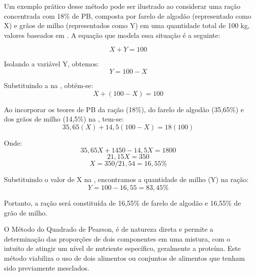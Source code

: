 Um exemplo prático desse método pode ser ilustrado ao considerar uma ração concentrada com 18\% de \gls{PB}, composta por farelo de algodão (representado como X) e grãos de milho (representados como Y) em uma quantidade total de 100 kg, valores baseados em . A equação que modela essa situação é a seguinte:

\begin{equation}
  \label{eq:algebrico1}
  X + Y = 100
\end{equation}

Isolando a variável Y, obtemos:
\begin{equation}
  \label{eq:algebrico2}
  Y = 100 - X
\end{equation}

Substituindo a  na , obtém-se:
\begin{equation}
  \label{eq:algebrico3}
  X + (100 - X) = 100
\end{equation}

Ao incorporar os teores de \gls{PB} da ração (18\%), do farelo de algodão (35,65\%) e dos grãos de milho (14,5\%) na , tem-se:
\begin{equation}
  \label{eq:algebrico4}
  35,65 (X) + 14,5 (100 - X) = 18 (100)
\end{equation}

Onde:
\begin{equation}
  \label{eq:algebrico5}
  35,65X + 1450 - 14,5X = 1800
\end{equation}
\begin{equation}
  \label{eq:algebrico6}
  21,15X = 350
\end{equation}
\begin{equation}
  \label{eq:algebrico7}
  X = 350 / 21,54 = 16,55\%
\end{equation}

Substituindo o valor de X na , encontramos a quantidade de milho (Y) na ração:
\begin{equation}
  \label{eq:algebrico8}
  Y = 100 - 16,55 = 83,45\%
\end{equation}

Portanto, a ração será constituída de 16,55\% de farelo de algodão e 16,55\% de grão de milho.

O Método do Quadrado de Pearson, é de natureza direta e permite a determinação das proporções de dois componentes em uma mistura, com o intuito de atingir um nível de nutriente específico, geralmente a proteína. Este método viabiliza o uso de dois alimentos ou conjuntos de alimentos que tenham sido previamente mesclados.

